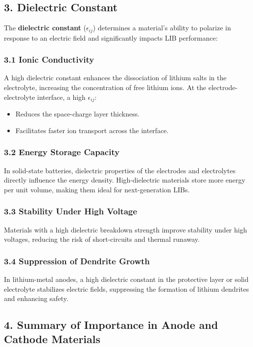 \documentclass[12pt]{article}
\begin{document}
\subsection*{3. Dielectric Constant}

The \textbf{dielectric constant} ($\epsilon_{ij}$) determines a material's ability to polarize in response to an electric field and significantly impacts LIB performance:

\subsubsection*{3.1 Ionic Conductivity}
A high dielectric constant enhances the dissociation of lithium salts in the electrolyte, increasing the concentration of free lithium ions. At the electrode-electrolyte interface, a high $\epsilon_{ij}$:
\begin{itemize}
    \item Reduces the space-charge layer thickness.
    \item Facilitates faster ion transport across the interface.
\end{itemize}

\subsubsection*{3.2 Energy Storage Capacity}
In solid-state batteries, dielectric properties of the electrodes and electrolytes directly influence the energy density. High-dielectric materials store more energy per unit volume, making them ideal for next-generation LIBs.

\subsubsection*{3.3 Stability Under High Voltage}
Materials with a high dielectric breakdown strength improve stability under high voltages, reducing the risk of short-circuits and thermal runaway.

\subsubsection*{3.4 Suppression of Dendrite Growth}
In lithium-metal anodes, a high dielectric constant in the protective layer or solid electrolyte stabilizes electric fields, suppressing the formation of lithium dendrites and enhancing safety.

\subsection*{4. Summary of Importance in Anode and Cathode Materials}
\end{document}
